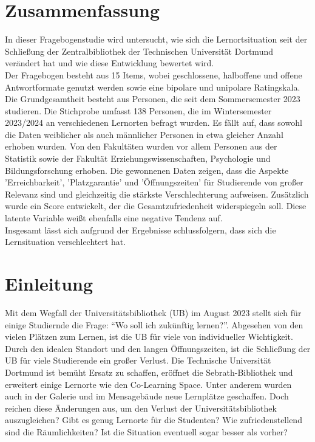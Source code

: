 \documentclass[11pt, a4paper]{article}
\begin{document}
\section*{Zusammenfassung}
In dieser Fragebogenstudie wird untersucht, wie sich die Lernortsituation seit der Schließung der Zentralbibliothek der Technischen Universität Dortmund verändert hat und wie diese Entwicklung bewertet wird.\\
Der Fragebogen besteht aus 15 Items, wobei geschlossene, halboffene und offene Antwortformate genutzt werden sowie eine bipolare und unipolare Ratingskala. \\
Die Grundgesamtheit besteht aus Personen, die seit dem Sommersemester 2023 studieren. Die Stichprobe umfasst 138 Personen, die im Wintersemester 2023/2024 an verschiedenen Lernorten befragt wurden.
Es fällt auf, dass sowohl die Daten weiblicher als auch männlicher Personen in etwa gleicher Anzahl erhoben wurden. Von den Fakultäten wurden vor allem Personen aus der Statistik sowie der Fakultät Erziehungswissenschaften, Psychologie und Bildungsforschung erhoben.
Die gewonnenen Daten zeigen, dass die Aspekte 'Erreichbarkeit',  'Platzgarantie' und 'Öffnungszeiten' für Studierende von großer Relevanz sind und gleichzeitig die stärkste Verschlechterung aufweisen. Zusätzlich wurde ein Score entwickelt, der die Gesamtzufriedenheit widerspiegeln soll. Diese latente Variable weißt ebenfalls eine negative Tendenz auf.\\
Insgesamt lässt sich aufgrund der Ergebnisse schlussfolgern, dass sich die Lernsituation verschlechtert hat.

\newpage\null\thispagestyle{empty}\newpage

\newpage
\cleardoublepage%
\section{Einleitung}
\label{Einleitung}
Mit dem Wegfall der Universitätsbibliothek (UB) im August 2023 stellt sich für einige Studiernde die Frage: “Wo soll ich zukünftig lernen?”.
Abgesehen von den vielen Plätzen zum Lernen, ist die UB für viele von individueller Wichtigkeit. \cite{.27.01.2024}
Durch den idealen Standort und den langen Öffnungszeiten, ist die Schließung der UB für viele Studierende ein großer Verlust.
Die Technische Universität Dortmund ist bemüht Ersatz zu schaffen, eröffnet die Sebrath-Bibliothek und erweitert einige Lernorte wie den Co-Learning Space.
Unter anderem wurden auch in der Galerie und im Mensagebäude neue Lernplätze geschaffen.
Doch reichen diese Änderungen aus, um den Verlust der Universitätsbibliothek auszugleichen?
Gibt es genug Lernorte für die Studenten? Wie zufriedenstellend sind die Räumlichkeiten?
Ist die Situation eventuell sogar besser als vorher?
\end{document}
